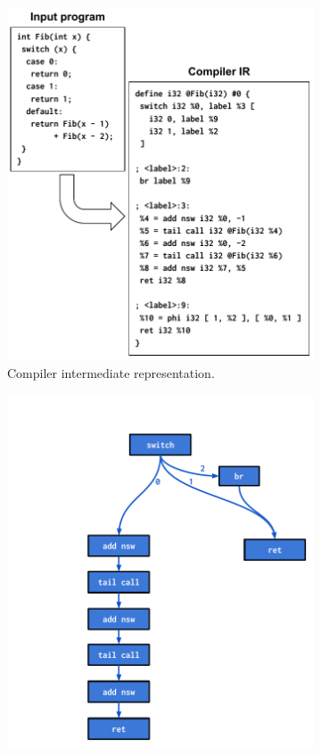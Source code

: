 \begin{figure}
  \centering %
  \begin{subfigure}{.48\linewidth}%
    \centering
    \includegraphics[width=\linewidth]{images/A_IR}%
    \caption{Compiler intermediate representation.}
    \label{subfigure:ir}%
  \end{subfigure}
  \begin{subfigure}{.48\linewidth}%
    \centering
    \includegraphics[width=\linewidth]{images/B_Control}%

\end{subfigure}
\end{figure}
